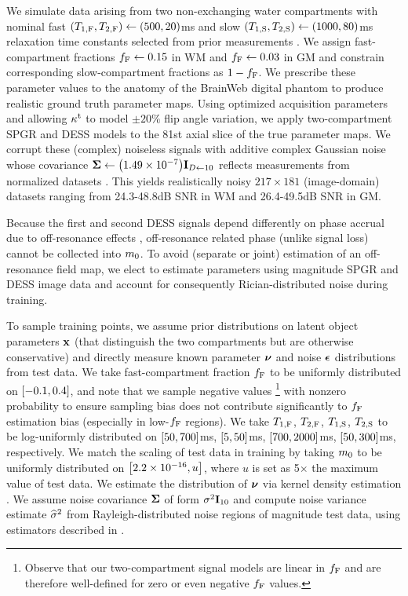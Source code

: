 We simulate data arising
from two non-exchanging water compartments
with nominal fast 
$\paren{\tf{1},\tf{2}} \gets \paren{500,20}$ms
and slow 
$\paren{\ts{1},\ts{2}} \gets \paren{1000,80}$ms
relaxation time constants 
selected from prior measurements 
\cite{mackay:94:ivv,deoni:11:com}.
We assign fast-compartment fractions
$f_{\mathrm{F}} \gets 0.15$ in WM and
$f_{\mathrm{F}} \gets 0.03$ in GM
and constrain corresponding slow-compartment fractions 
as $1-f_{\mathrm{F}}$.
We prescribe these parameter values 
to the anatomy of the BrainWeb digital phantom
\cite{collins:98:dac}
to produce realistic ground truth parameter maps.
Using optimized acquisition parameters
and allowing $\kappa^{\mathrm{t}}$ to model $\pm20\%$ flip angle variation,
we apply two-compartment SPGR and DESS models
to the 81st axial slice of the true parameter maps.
We corrupt these (complex) noiseless signals
with additive complex Gaussian noise
whose covariance $\bmSig \gets \paren{1.49\times10^{-7}} \eye{D\gets10}$
reflects measurements
from normalized datasets \cite{nataraj::oms}.
This yields realistically noisy $217\times181$ (image-domain) datasets
ranging from 24.3-48.8dB SNR in WM
and 26.4-49.5dB SNR in GM.

Because the first and second DESS signals depend differently
on phase accrual due to off-resonance effects \cite{nataraj::oms},
off-resonance related phase (unlike signal loss) 
cannot be collected into $m_0$.
To avoid (separate or joint) estimation
of an off-resonance field map, 
we elect to estimate parameters 
using magnitude SPGR and DESS image data
and account for consequently Rician-distributed noise
during training.

To sample training points, 
we assume prior distributions 
on latent object parameters $\mathbf{x}$
(that distinguish the two compartments
but are otherwise conservative)
and directly measure 
known parameter $\boldsymbol{\nu}$ and noise $\boldsymbol{\epsilon}$ distributions
from test data.
We take fast-compartment fraction $f_{\mathrm{F}}$ 
to be uniformly distributed
on $\brac{-0.1,0.4}$,
and note
that we sample negative values
\footnote{Observe that our two-compartment signal models
	are linear in $f_{\mathrm{F}}$
	and are therefore well-defined
	for zero or even negative $f_{\mathrm{F}}$ values.
} 
with nonzero probability
to ensure sampling bias does not contribute significantly
to $f_{\mathrm{F}}$ estimation bias 
(especially in low-$f_{\mathrm{F}}$ regions).
We take $T_{1,\mathrm{F}}$, $T_{2,\mathrm{F}}$, $T_{1,\mathrm{S}}$, $T_{2,\mathrm{S}}$ 
to be log-uniformly distributed
on $\brac{50,700}$ms, $\brac{5,50}$ms, $\brac{700,2000}$ms, $\brac{50,300}$ms,
respectively.
We match the scaling of test data
in training
by taking $m_0$ 
to be uniformly distributed on $\brac{\eps,u}$, 
where $u$ is set as 5$\times$ the maximum value of test data.
We estimate the distribution of $\boldsymbol{\nu}$
via kernel density estimation
\cite{parzen:62:oeo}.
We assume noise covariance $\boldsymbol{\Sigma}$ 
of form $\sigma^2 \mathbf{I}_{10}$
and compute noise variance estimate $\widehat{\sigma}^2$
from Rayleigh-distributed noise regions
of magnitude test data, using estimators described in 
\cite{siddiqui:64:sif}.

